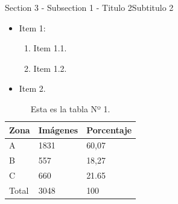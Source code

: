 \documentclass{beamer}
\begin{document}
\begin{frame}{Section 3 - Subsection 1 - Titulo 2}{Subtitulo 2}
\begin{itemize}
    \item Item 1:
    \begin{enumerate}
        \item Item 1.1.
        \item Item 1.2.
    \end{enumerate}
    \item Item 2.
\end{itemize}
\end{frame}


\begin{frame}
  \begin{table}[H]
\centering
\caption{Esta es la tabla Nº 1.}
\begin{tabular}{@{}lll@{}}
\toprule
Zona     & Imágenes & Porcentaje \\ \midrule
A        & 1831     & 60,07      \\
B        & 557      & 18,27      \\
C        & 660      & 21.65      \\
Total    & 3048     & 100        \\ \bottomrule
\end{tabular}
\end{table}

\end{frame}    
\end{document}
